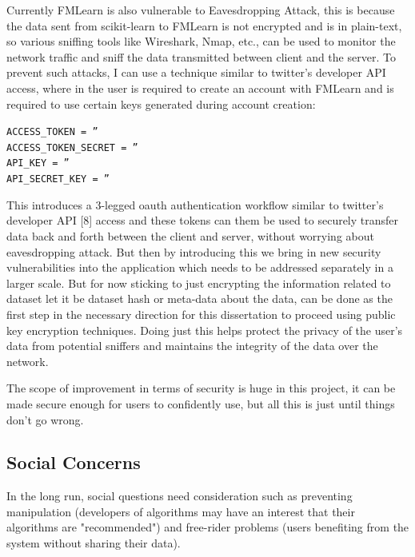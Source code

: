 Currently FMLearn is also vulnerable to Eavesdropping Attack, this is because the data sent from scikit-learn to FMLearn is not encrypted and is in plain-text, so various sniffing tools like Wireshark, Nmap, etc., can be used to monitor the network traffic and sniff the data transmitted between client and the server. To prevent such attacks, I can use a technique similar to twitter’s developer API access, where in the user is required to create an account with FMLearn and is required to use certain keys generated during account creation:

\begin{center}
\texttt{ACCESS\_TOKEN = ''\\}
\texttt{ACCESS\_TOKEN\_SECRET = ''\\}
\texttt{API\_KEY = ''\\}
\texttt{API\_SECRET\_KEY = ''}
\end{center}

This introduces a 3-legged oauth authentication workflow similar to twitter’s developer API [8] access and these tokens can them be used to securely transfer data back and forth between the client and server, without worrying about eavesdropping attack. But then by introducing this we bring in new security vulnerabilities into the application which needs to be addressed separately in a larger scale. But for now sticking to just encrypting the information related to dataset let it be dataset hash or meta-data about the data, can be done as the first step in the necessary direction for this dissertation to proceed using public key encryption techniques. Doing just this helps protect the privacy of the user’s data from potential sniffers and maintains the integrity of the data over the network.

The scope of improvement in terms of security is huge in this project, it can be made secure enough for users to confidently use, but all this is just until things don’t go wrong.

\subsection{Social Concerns}
In the long run, social questions need consideration such as preventing manipulation (developers of algorithms may have an interest that their algorithms are "recommended") and free-rider problems (users benefiting from the system without sharing their data).

